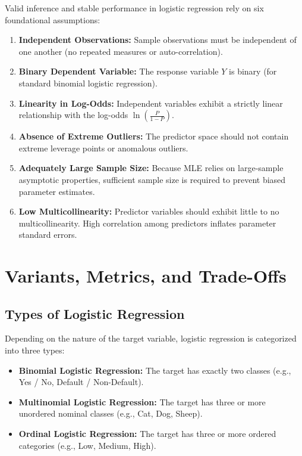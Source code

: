 Valid inference and stable performance in logistic regression rely on six foundational assumptions:
\begin{enumerate}
    \item \textbf{Independent Observations:} Sample observations must be independent of one another (no repeated measures or auto-correlation).
    \item \textbf{Binary Dependent Variable:} The response variable $Y$ is binary (for standard binomial logistic regression).
    \item \textbf{Linearity in Log-Odds:} Independent variables exhibit a strictly linear relationship with the log-odds $\ln\left(\frac{P}{1-P}\right)$.
    \item \textbf{Absence of Extreme Outliers:} The predictor space should not contain extreme leverage points or anomalous outliers.
    \item \textbf{Adequately Large Sample Size:} Because MLE relies on large-sample asymptotic properties, sufficient sample size is required to prevent biased parameter estimates.
    \item \textbf{Low Multicollinearity:} Predictor variables should exhibit little to no multicollinearity. High correlation among predictors inflates parameter standard errors.
\end{enumerate}

\section{Variants, Metrics, and Trade-Offs}

\subsection{Types of Logistic Regression}
Depending on the nature of the target variable, logistic regression is categorized into three types:
\begin{itemize}
    \item \textbf{Binomial Logistic Regression:} The target has exactly two classes (e.g., Yes / No, Default / Non-Default).
    \item \textbf{Multinomial Logistic Regression:} The target has three or more unordered nominal classes (e.g., Cat, Dog, Sheep).
    \item \textbf{Ordinal Logistic Regression:} The target has three or more ordered categories (e.g., Low, Medium, High).
\end{itemize}

